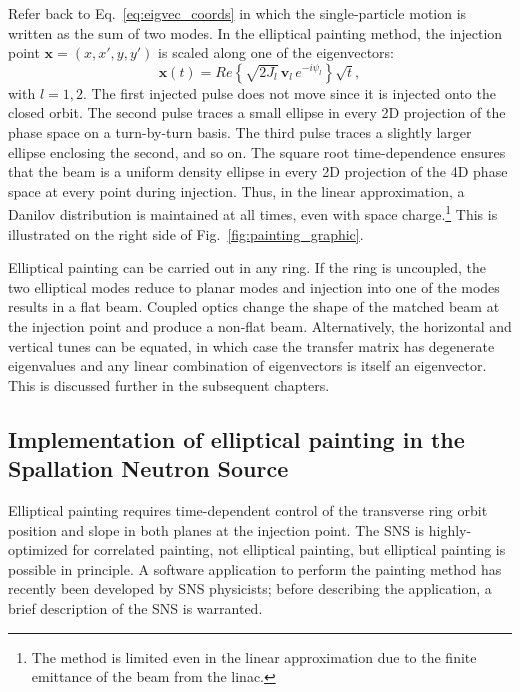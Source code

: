 Refer back to Eq.~\eqref{eq:eigvec_coords} in which the single-particle motion is written as the sum of two modes. In the elliptical painting method, the injection point $\mathbf{x} = (x, x', y, y')$ is scaled along one of the eigenvectors:
%
\begin{equation}\label{eq:elliptical_painting}
    \mathbf{x}(t) =  
    Re \left\{ \sqrt{2 J_l} \, \mathbf{v}_l \, e^{-i\psi_l} \right\} \sqrt{t},
\end{equation}
%
with $l = 1,2$. The first injected pulse does not move since it is injected onto the closed orbit. The second pulse traces a small ellipse in every 2D projection of the phase space on a turn-by-turn basis. The third pulse traces a slightly larger ellipse enclosing the second, and so on. The square root time-dependence ensures that the beam is a uniform density ellipse in every 2D projection of the 4D phase space at every point during injection. Thus, in the linear approximation, a Danilov distribution is maintained at all times, even with space charge.\footnote{The method is limited even in the linear approximation due to the finite emittance of the beam from the linac.} This is illustrated on the right side of Fig.~\ref{fig:painting_graphic}.

Elliptical painting can be carried out in any ring. If the ring is uncoupled, the two elliptical modes reduce to planar modes and injection into one of the modes results in a flat beam. Coupled optics change the shape of the matched beam at the injection point and produce a non-flat beam. Alternatively, the horizontal and vertical tunes can be equated, in which case the transfer matrix has degenerate eigenvalues and any linear combination of eigenvectors is itself an eigenvector. This is discussed further in the subsequent chapters.


\subsection{Implementation of elliptical painting in the Spallation Neutron Source}

Elliptical painting requires time-dependent control of the transverse ring orbit position and slope in both planes at the injection point. The SNS is highly-optimized for correlated painting, not elliptical painting, but elliptical painting is possible in principle. A software application to perform the painting method has recently been developed by SNS physicists; before describing the application, a brief description of the SNS is warranted. 

